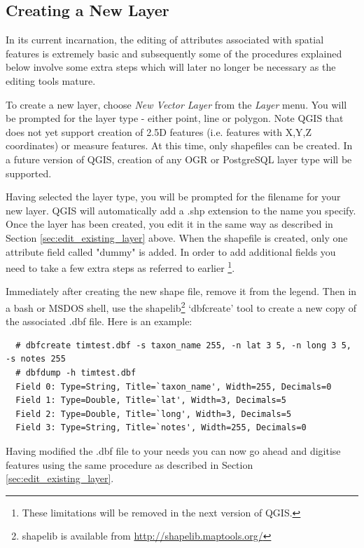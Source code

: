 \subsection{Creating a New Layer}

In its current incarnation, the editing of attributes associated with spatial
features is extremely basic and subsequently some of the procedures explained
below involve some extra steps which will later no longer be necessary as
the editing tools mature.

To create a new layer, choose \textit{New Vector Layer} from the \textit{Layer}
menu. You will be prompted for the layer type - either point, line or polygon.
Note QGIS that
does not yet support creation of 2.5D features (i.e. features with X,Y,Z
coordinates) or measure features. At this time, only shapefiles can be
created. In a future version of QGIS, creation of any OGR or PostgreSQL layer type will be supported.

Having selected the layer type, you will be prompted for the filename for your
new layer. QGIS will automatically add a .shp extension to the name you specify.
Once the layer has been created, you edit it in the same way as described in
Section \ref{sec:edit_existing_layer} above. When the shapefile is created,
only one attribute field called "dummy" is added.
In order to add additional fields you need to
take a few extra steps as referred to earlier \footnote{These
limitations will be removed in the next version of QGIS.}. 

Immediately after creating the new shape file, remove it from the legend. Then in a bash or MSDOS shell, use the
shapelib\footnote{shapelib is available from
\url{http://shapelib.maptools.org/}} `dbfcreate' tool to create a new copy of
the associated .dbf file. Here is an example:

\begin{verbatim}
  # dbfcreate timtest.dbf -s taxon_name 255, -n lat 3 5, -n long 3 5, -s notes 255
  # dbfdump -h timtest.dbf
  Field 0: Type=String, Title=`taxon_name', Width=255, Decimals=0
  Field 1: Type=Double, Title=`lat', Width=3, Decimals=5
  Field 2: Type=Double, Title=`long', Width=3, Decimals=5
  Field 3: Type=String, Title=`notes', Width=255, Decimals=0
\end{verbatim} 

Having modified the .dbf file to your needs you can now go ahead and digitise features using the same procedure as described in Section \ref{sec:edit_existing_layer}.
